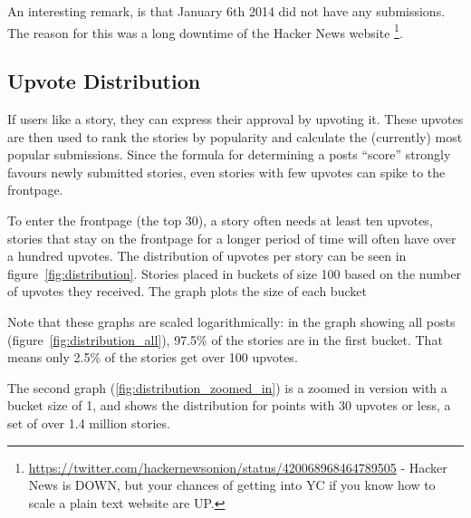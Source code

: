 An interesting remark, is that January 6th 2014 did not have any submissions. The reason for this was a long downtime of the Hacker News website
\footnote{\url{https://twitter.com/hackernewsonion/status/420068968464789505} - Hacker News is DOWN, but your chances of getting into YC if you know how to scale a plain text website are UP.}.

\subsection{Upvote Distribution}
If users like a story, they can express their approval by upvoting it. These upvotes are then used to rank the stories by popularity and calculate the (currently) most popular submissions. Since the formula for determining a posts ``score'' strongly favours newly submitted stories, even stories with few upvotes can spike to the frontpage.

To enter the frontpage (the top 30), a story often needs at least ten upvotes, stories that stay on the frontpage for a longer period of time will often have over a hundred upvotes. The distribution of upvotes per story can be seen in figure~\ref{fig:distribution}. Stories placed in buckets of size 100 based on the number of upvotes they received. The graph plots the size of each bucket

Note that these graphs are scaled logarithmically: in the graph showing all posts (figure~\ref{fig:distribution_all}), 97.5\% of the stories are in the first bucket. That means only 2.5\% of the stories get over 100 upvotes. 

The second graph (\ref{fig:distribution_zoomed_in}) is a zoomed in version with a bucket size of 1, and shows the distribution for points with 30 upvotes or less, a set of over 1.4 million stories.

